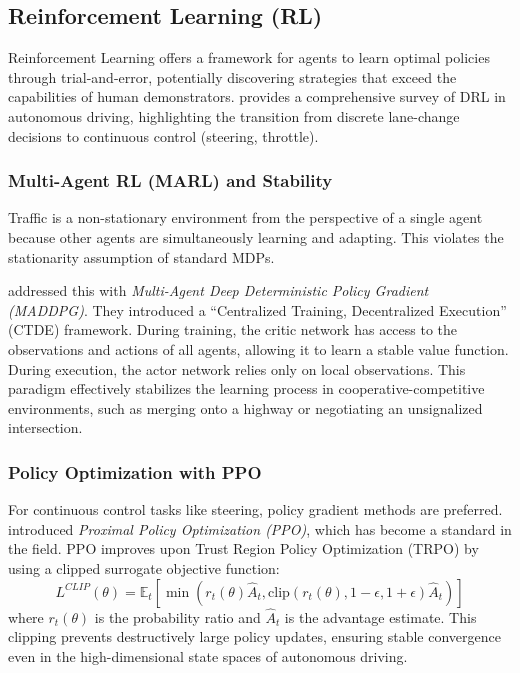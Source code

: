 \documentclass[12pt, a4paper]{article}
\begin{document}
\subsection{Reinforcement Learning (RL)}
Reinforcement Learning offers a framework for agents to learn optimal policies through trial-and-error, potentially discovering strategies that exceed the capabilities of human demonstrators. \cite{kiran2021deep} provides a comprehensive survey of DRL in autonomous driving, highlighting the transition from discrete lane-change decisions to continuous control (steering, throttle).

\subsubsection{Multi-Agent RL (MARL) and Stability}
Traffic is a non-stationary environment from the perspective of a single agent because other agents are simultaneously learning and adapting. This violates the stationarity assumption of standard MDPs.

\cite{lowe2017multi} addressed this with \textit{Multi-Agent Deep Deterministic Policy Gradient (MADDPG)}. They introduced a ``Centralized Training, Decentralized Execution'' (CTDE) framework. During training, the critic network has access to the observations and actions of all agents, allowing it to learn a stable value function. During execution, the actor network relies only on local observations. This paradigm effectively stabilizes the learning process in cooperative-competitive environments, such as merging onto a highway or negotiating an unsignalized intersection.

\subsubsection{Policy Optimization with PPO}
For continuous control tasks like steering, policy gradient methods are preferred. \cite{schulman2017proximal} introduced \textit{Proximal Policy Optimization (PPO)}, which has become a standard in the field. PPO improves upon Trust Region Policy Optimization (TRPO) by using a clipped surrogate objective function:
\begin{equation}
    L^{CLIP}(\theta) = \mathbb{E}_t \left[ \min(r_t(\theta)\hat{A}_t, \text{clip}(r_t(\theta), 1-\epsilon, 1+\epsilon)\hat{A}_t) \right]
\end{equation}
where $r_t(\theta)$ is the probability ratio and $\hat{A}_t$ is the advantage estimate. This clipping prevents destructively large policy updates, ensuring stable convergence even in the high-dimensional state spaces of autonomous driving.
\end{document}
